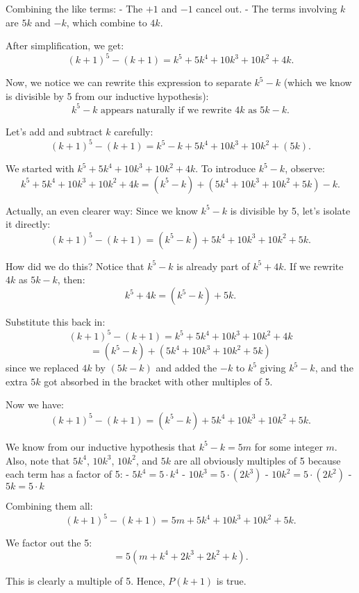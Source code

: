 \documentclass[12pt,a4paper]{article}
\begin{document}
   Combining the like terms:
   - The $+1$ and $-1$ cancel out.
   - The terms involving $k$ are $5k$ and $-k$, which combine to $4k$.

\medskip

   After simplification, we get:
   \[
   (k+1)^5 - (k+1) = k^5 + 5k^4 + 10k^3 + 10k^2 + 4k.
   \]

   Now, we notice we can rewrite this expression to separate $k^5 - k$ (which we know is divisible by 5 from our inductive hypothesis):
   \[
   k^5 - k \text{ appears naturally if we rewrite } 4k \text{ as } 5k - k.
   \]

   Let's add and subtract $k$ carefully:
   \[
   (k+1)^5 - (k+1) = k^5 - k + 5k^4 + 10k^3 + 10k^2 + (5k).
   \]

   We started with $k^5 + 5k^4 + 10k^3 + 10k^2 + 4k$. To introduce $k^5 - k$, observe:
   \[
   k^5 + 5k^4 + 10k^3 + 10k^2 + 4k = (k^5 - k) + (5k^4 + 10k^3 + 10k^2 + 5k) - k.
   \]

   Actually, an even clearer way:  
   Since we know $k^5-k$ is divisible by 5, let's isolate it directly:
   \[
   (k+1)^5 - (k+1) = (k^5 - k) + 5k^4 + 10k^3 + 10k^2 + 5k.
   \]
   
   How did we do this? Notice that $k^5 - k$ is already part of $k^5 + 4k$. If we rewrite $4k$ as $5k - k$, then:
   \[
   k^5 + 4k = (k^5 - k) + 5k.
   \]

   Substitute this back in:
   \[
   (k+1)^5 - (k+1) = k^5 + 5k^4 + 10k^3 + 10k^2 + 4k
   \]
   \[
   = (k^5 - k) + (5k^4 + 10k^3 + 10k^2 + 5k)
   \]
   since we replaced $4k$ by $(5k - k)$ and added the $-k$ to $k^5$ giving $k^5 - k$, and the extra $5k$ got absorbed in the bracket with other multiples of 5.

   Now we have:
   \[
   (k+1)^5 - (k+1) = (k^5 - k) + 5k^4 + 10k^3 + 10k^2 + 5k.
   \]

   We know from our inductive hypothesis that $k^5 - k=5m$ for some integer $m$. Also, note that $5k^4$, $10k^3$, $10k^2$, and $5k$ are all obviously multiples of 5 because each term has a factor of 5:
   - $5k^4 = 5 \cdot k^4$
   - $10k^3 = 5 \cdot (2k^3)$
   - $10k^2 = 5 \cdot (2k^2)$
   - $5k = 5 \cdot k$

   Combining them all:
   \[
   (k+1)^5 - (k+1) = 5m + 5k^4 + 10k^3 + 10k^2 + 5k.
   \]

   We factor out the 5:
   \[
   = 5(m + k^4 + 2k^3 + 2k^2 + k).
   \]

   This is clearly a multiple of 5. Hence, $P(k+1)$ is true.
\end{document}
